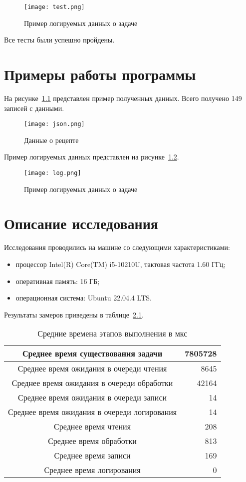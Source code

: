 \begin{figure}[H]
	\centering
	\texttt{[image: test.png]}
	\caption{Пример логируемых данных о задаче}
	\label{fig:test}
\end{figure} 

Все тесты были успешно пройдены.
\clearpage

\chapter{Примеры работы программы}

На рисунке~\ref{fig:json} представлен пример полученных данных. Всего получено 149 записей с данными.
\begin{figure}[H]
	\centering
	\texttt{[image: json.png]}
	\caption{Данные о рецепте}
	\label{fig:json}
\end{figure}

Пример логируемых данных представлен на рисунке~\ref{fig:log}.
\begin{figure}[H]
	\centering
	\texttt{[image: log.png]}
	\caption{Пример логируемых данных о задаче}
	\label{fig:log}
\end{figure}
\clearpage


\chapter{Описание исследования}

Исследования проводились на машине со следующими характеристиками:
\begin{itemize}[label=---]
	\item процессор Intel(R) Core(TM) i5-10210U, тактовая частота 1.60 ГГц;
	\item оперативная память: 16 ГБ;
	\item операционная система: Ubuntu 22.04.4 LTS.
\end{itemize}

Результаты замеров приведены в таблице~\ref{tab:all_times}.

\begin{table}[H]
	\caption{Средние времена этапов выполнения в мкс}
	\label{tab:all_times}
	\centering
	\begin{tabular}{|c|r|}
	\hline
	Среднее время существования задачи & 7805728\\\hline
	Среднее время ожидания в очереди чтения & 8645\\\hline
	Среднее время ожидания в очереди обработки & 42164\\\hline
	Среднее время ожидания в очереди записи & 14\\\hline
	Среднее время ожидания в очереди логирования & 14\\\hline
	Среднее время чтения & 208\\\hline
	Среднее время обработки & 813\\\hline
	Среднее время записи & 169\\\hline
	Среднее время логирования & 0\\\hline
	\end{tabular}
\end{table}
	
